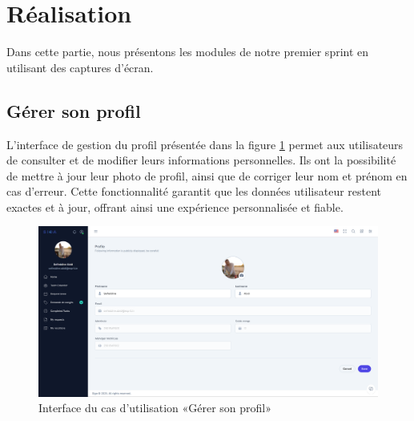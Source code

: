\section{Réalisation}
Dans cette partie, nous présentons les modules de notre premier sprint en utilisant des captures d’écran.
\subsection{Gérer son profil}
L'interface de gestion du profil présentée dans la figure \ref{fig:gp} permet aux utilisateurs de consulter et de modifier leurs informations personnelles. Ils ont la possibilité de mettre à jour leur photo de profil, ainsi que de corriger leur nom et prénom en cas d'erreur. Cette fonctionnalité garantit que les données utilisateur restent exactes et à jour, offrant ainsi une expérience personnalisée et fiable.
\begin{figure}[h]
     \centering
     \includegraphics[width=16cm]{images/realisation/gp.png}
     \caption{Interface du cas d’utilisation «Gérer son profil»}
     \label{fig:gp}
\end{figure}
